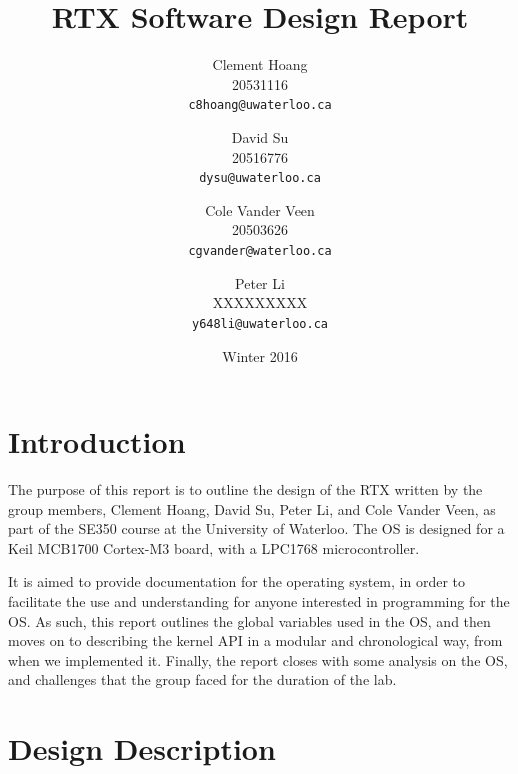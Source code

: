 \documentclass[12pt]{report}
\begin{document}
\title{RTX Software Design Report}

\author{
    Clement Hoang\\
		20531116\\
    \texttt{c8hoang@uwaterloo.ca}
    \and
    David Su\\
		20516776\\
    \texttt{dysu@uwaterloo.ca}
    \and
    Cole Vander Veen\\
		20503626\\
    \texttt{cgvander@waterloo.ca}
    \and
    Peter Li\\
		XXXXXXXXX\\
    \texttt{y648li@uwaterloo.ca}
}

\date{Winter 2016}

\maketitle


\tableofcontents
\listofalgorithms
\listoffigures

\chapter{Introduction}

The purpose of this report is to outline the design of the RTX written by the group members, Clement Hoang, David Su, Peter Li, and Cole Vander Veen, as part of the SE350 course at the University of Waterloo. The OS is designed for a Keil MCB1700 Cortex-M3 board, with a LPC1768 microcontroller.

It is aimed to provide documentation for the operating system, in order to facilitate the use and understanding for anyone interested in programming for the OS. As such, this report outlines the global variables used in the OS, and then moves on to describing the kernel API in a modular and chronological way, from when we implemented it. Finally, the report closes with some analysis on the OS, and challenges that the group faced for the duration of the lab.

\chapter{Design Description}
\end{document}
